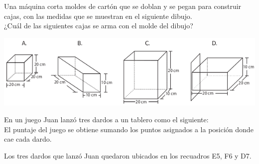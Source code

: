 \documentclass[10pt,letterpaper,addpoints]{exam}
\begin{document}
\begin{questions}
\begin{minipage}{.65\textwidth}
\question
Una máquina corta moldes de cartón que se doblan y se pegan para construir cajas, con las medidas que se muestran en el siguiente dibujo.\\

¿Cuál de las siguientes cajas se arma con el molde del dibujo?
\end{minipage}
\begin{minipage}{.35\textwidth}
\end{minipage}
\begin{center}
\includegraphics[scale=.75]{Images/cajas.png} 
\end{center}
\begin{minipage}{.35\textwidth}
\question
En un juego Juan lanzó tres dardos a un tablero como el siguiente:\\

El puntaje del juego se obtiene sumando los puntos asignados a la posición donde cae cada dardo.

Los tres dardos que lanzó Juan quedaron ubicados en los recuadros E5, F6 y D7.\\


\end{minipage}
\end{questions}
\end{document}
